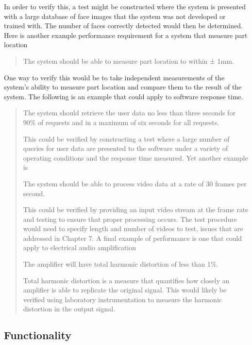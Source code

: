 In order to verify this, a test might be constructed where the system is
presented with a large database of face images that the system was not
developed or trained with. The number of faces correctly detected would
then be determined. Here is another example performance requirement for
a system that measure part location

\begin{quote}
The system should be able to measure part location to within ± 1mm.
\end{quote}

One way to verify this would be to take independent measurements of the
system's ability to measure part location and compare them to the result
of the system. The following is an example that could apply to software
response time.

\begin{quote}
The system should retrieve the user data no less than three seconds for
90\% of requests and in a maximum of six seconds for all requests.

This could be verified by constructing a test where a large number of
queries for user data are presented to the software under a variety of
operating conditions and the response time measured. Yet another example
is

The system should be able to process video data at a rate of 30 frames
per second.

This could be verified by providing an input video stream at the frame
rate and testing to ensure that proper processing occurs. The test
procedure would need to specify length and number of videos to test,
issues that are addressed in Chapter 7. A final example of performance
is one that could apply to electrical audio amplification

The amplifier will have total harmonic distortion of less than 1\%.

Total harmonic distortion is a measure that quantifies how closely an
amplifier is able to replicate the original signal. This would likely be
verified using laboratory instrumentation to measure the harmonic
distortion in the output signal.
\end{quote}

\subsection*{Functionality}
\label{section:functionality}


